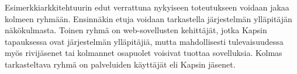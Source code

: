 Esimerkkiarkkitehtuurin edut verrattuna nykyiseen toteutukseen voidaan jakaa kolmeen ryhmään. Ensinnäkin etuja voidaan tarkastella järjestelmän ylläpitäjän näkökulmasta. Toinen ryhmä on web-sovellusten kehittäjät, jotka Kapsin tapauksessa ovat järjestelmän ylläpitäjiä, mutta mahdollisesti tulevaisuudessa myös rivijäsenet tai kolmannet osapuolet voisivat tuottaa sovelluksia. Kolmas tarkasteltava ryhmä on palveluiden käyttäjät eli Kapsin jäsenet.